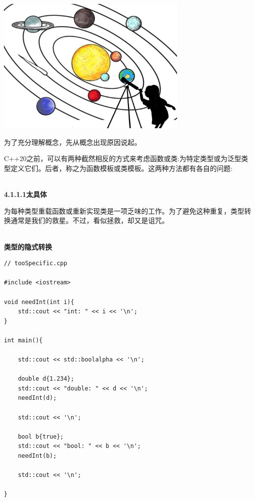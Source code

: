 
\begin{center}
\includegraphics[width=0.7\textwidth]{content/3/chapter4/images/2.png}\\
\end{center}

为了充分理解概念，先从概念出现原因说起。


C++20之前，可以有两种截然相反的方式来考虑函数或类:为特定类型或为泛型类型定义它们。后者，称之为函数模板或类模板。这两种方法都有各自的问题:

\hspace*{\fill} \\ %
\noindent
\textbf{4.1.1.1\hspace{0.2cm}太具体}

为每种类型重载函数或重新实现类是一项乏味的工作。为了避免这种重复，类型转换通常是我们的救星。不过，看似拯救，却又是诅咒。

\hspace*{\fill} \\ %
\noindent
\textbf{类型的隐式转换}
\begin{lstlisting}[style=styleCXX]
// tooSpecific.cpp

#include <iostream>

void needInt(int i){
	std::cout << "int: " << i << '\n';
}

int main(){

	std::cout << std::boolalpha << '\n';
	
	double d{1.234};
	std::cout << "double: " << d << '\n';
	needInt(d);
	
	std::cout << '\n';
	
	bool b{true};
	std::cout << "bool: " << b << '\n';
	needInt(b);
	
	std::cout << '\n';

}
\end{lstlisting}

